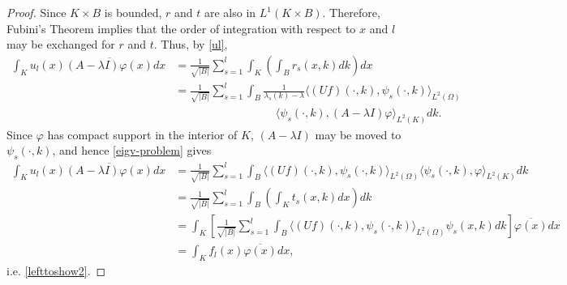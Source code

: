 \begin{theorem}
\begin{proof}
		Since $K \times B$ is bounded, $r$ and $t$ are also in $L^{1}(K \times B)$. Therefore, Fubini’s Theorem implies that the order of integration with respect to $x$ and $l$ may be exchanged for $r$ and $t$. Thus, by \eqref{ul},
			\begin{align*}
				\int_{K} u_{l}(x) \overline{(A - \lambda I) \varphi(x)} dx & = \frac{1}{\sqrt{|B|}} \sum_{s=1}^{l} \int_{K} \left( \int_{B} r_{s}(x, k) dk \right) dx \\
					& = \frac{1}{\sqrt{|B|}} \sum_{s=1}^{l} \int_{B} \frac{1}{\lambda_{s}(k) - \lambda} \langle (Uf)(\cdot, k), \psi_{s}(\cdot, k) \rangle_{L^{2}(\Omega)} \\
					& ~\qquad ~\qquad ~\qquad ~\qquad \langle \psi_{s}(\cdot, k), (A - \lambda I) \varphi \rangle_{L^{2}(K)} dk. 
			\end{align*}
			Since $\varphi$ has compact support in the interior of $K$, $(A - \lambda I)$ may be moved to $\psi_{s}(\cdot, k)$, and hence \eqref{eigv-problem} gives %
			\begin{align*}
				\int_{K} u_{l}(x) \overline{(A - \lambda I) \varphi(x)} dx					& = \frac{1}{\sqrt{|B|}} \sum_{s=1}^{l} \int_{B} \langle (Uf)(\cdot, k), \psi_{s}(\cdot, k) \rangle_{L^{2}(\Omega)} \langle \psi_{s}(\cdot, k), \varphi \rangle_{L^{2}(K)} dk \\
				 	& = \frac{1}{\sqrt{|B|}} \sum_{s=1}^{l} \int_{B} \left( \int_{K} t_{s}(x, k) dx \right) dk \\
					& = \int_{K} \left[ \frac{1}{\sqrt{|B|}} \sum_{s=1}^{l} \int_{B} \langle (Uf)(\cdot, k), \psi_{s}(\cdot, k) \rangle_{L^{2}(\Omega)} \psi_{s}(x, k) dk \right] \overline{\varphi(x)} dx \\
					& = \int_{K} f_{l}(x) \overline{\varphi(x)} dx,
			\end{align*}
			i.e. \eqref{lefttoshow2}.
	\end{proof}
\end{theorem}